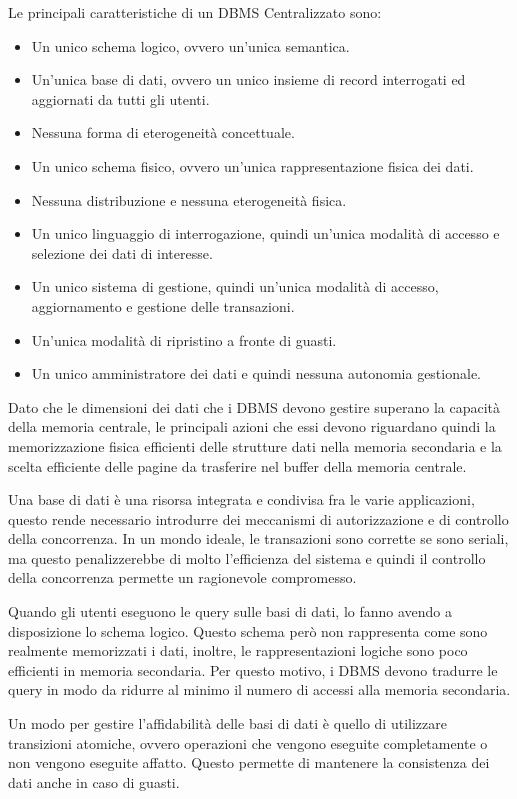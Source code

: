 Le principali caratteristiche di un DBMS Centralizzato sono:
\begin{itemize}
      \item Un unico schema logico, ovvero un'unica semantica.
      \item Un'unica base di dati, ovvero un unico insieme di record interrogati
            ed aggiornati da tutti gli utenti.
      \item Nessuna forma di eterogeneità concettuale.
      \item Un unico schema fisico, ovvero un'unica rappresentazione fisica dei
            dati.
      \item Nessuna distribuzione e nessuna eterogeneità fisica.
      \item Un unico linguaggio di interrogazione, quindi un'unica modalità di
            accesso e selezione dei dati di interesse.
      \item Un unico sistema di gestione, quindi un'unica modalità di accesso,
            aggiornamento e gestione delle transazioni.
      \item Un'unica modalità di ripristino a fronte di guasti.
      \item Un unico amministratore dei dati e quindi nessuna autonomia gestionale.
\end{itemize}
Dato che le dimensioni dei dati che i DBMS devono gestire superano la capacità
della memoria centrale, le principali azioni che essi devono riguardano quindi la
memorizzazione fisica efficienti delle strutture dati nella memoria secondaria e
la scelta efficiente delle pagine da trasferire nel buffer della memoria
centrale.

Una base di dati è una risorsa integrata e condivisa fra le varie applicazioni,
questo rende necessario introdurre dei meccanismi di autorizzazione e di
controllo della concorrenza. In un mondo ideale, le transazioni sono corrette se
sono seriali, ma questo penalizzerebbe di molto l'efficienza del sistema e
quindi il controllo della concorrenza permette un ragionevole compromesso.

Quando gli utenti eseguono le query sulle basi di dati, lo fanno avendo a disposizione
lo schema logico. Questo schema però non rappresenta come sono realmente memorizzati
i dati, inoltre, le rappresentazioni logiche sono poco efficienti in memoria
secondaria. Per questo motivo, i DBMS devono tradurre le query in modo da ridurre
al minimo il numero di accessi alla memoria secondaria.

Un modo per gestire l'affidabilità delle basi di dati è quello di utilizzare
transizioni atomiche, ovvero operazioni che vengono eseguite completamente o
non vengono eseguite affatto. Questo permette di mantenere la consistenza dei
dati anche in caso di guasti.

